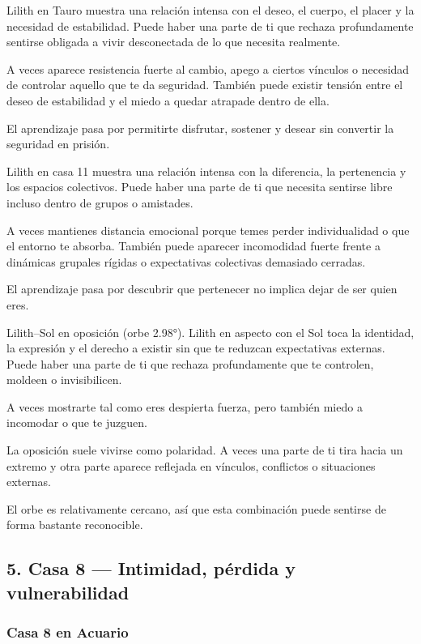 \documentclass[11pt,a4paper]{article}
\begin{document}
Lilith en Tauro muestra una relación intensa con el deseo, el cuerpo, el placer y la necesidad de estabilidad. Puede haber una parte de ti que rechaza profundamente sentirse obligada a vivir desconectada de lo que necesita realmente.

A veces aparece resistencia fuerte al cambio, apego a ciertos vínculos o necesidad de controlar aquello que te da seguridad. También puede existir tensión entre el deseo de estabilidad y el miedo a quedar atrapade dentro de ella.

El aprendizaje pasa por permitirte disfrutar, sostener y desear sin convertir la seguridad en prisión.

Lilith en casa 11 muestra una relación intensa con la diferencia, la pertenencia y los espacios colectivos. Puede haber una parte de ti que necesita sentirse libre incluso dentro de grupos o amistades.

A veces mantienes distancia emocional porque temes perder individualidad o que el entorno te absorba. También puede aparecer incomodidad fuerte frente a dinámicas grupales rígidas o expectativas colectivas demasiado cerradas.

El aprendizaje pasa por descubrir que pertenecer no implica dejar de ser quien eres.

Lilith–Sol en oposición (orbe 2.98°).
Lilith en aspecto con el Sol toca la identidad, la expresión y el derecho a existir sin que te reduzcan expectativas externas. Puede haber una parte de ti que rechaza profundamente que te controlen, moldeen o invisibilicen.

A veces mostrarte tal como eres despierta fuerza, pero también miedo a incomodar o que te juzguen.

La oposición suele vivirse como polaridad. A veces una parte de ti tira hacia un extremo y otra parte aparece reflejada en vínculos, conflictos o situaciones externas.

El orbe es relativamente cercano, así que esta combinación puede sentirse de forma bastante reconocible.

\vspace{0.4cm}

\subsection{5. Casa 8 — Intimidad, pérdida y vulnerabilidad}

\subsubsection*{Casa 8 en Acuario}
\end{document}

